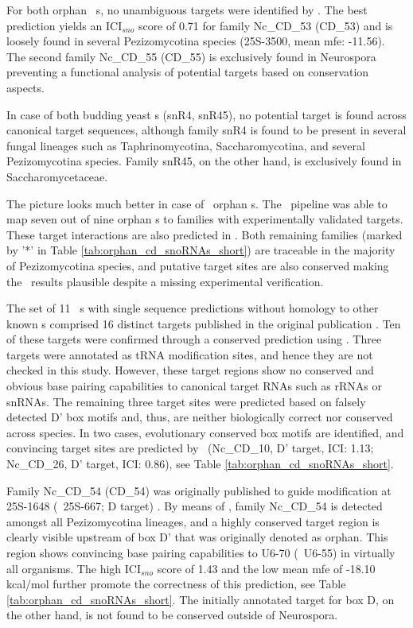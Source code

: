 For both orphan \ncr\ \sno s, no unambiguous targets were identified by
\snostrip. The best prediction yields an ICI$_{sno}$ score of 0.71 for
family Nc\_CD\_53 (CD\_53) and is loosely found in several
Pezizomycotina species (25S-3500, mean mfe: -11.56). The second family
Nc\_CD\_55 (CD\_55) is exclusively found in Neurospora preventing a
functional analysis of potential targets based on conservation
aspects.

In case of both budding yeast \sno s (snR4, snR45), no potential target is
found across canonical target sequences, although family snR4 is found to
be present in several fungal lineages such as Taphrinomycotina,
Saccharomycotina, and several Pezizomycotina species. Family snR45, on the
other hand, is exclusively found in Saccharomycetaceae.

The picture looks much better in case of \afu\ orphan \sno s. The
\snostrip\ pipeline was able to map seven out of nine orphan \cd s to
families with experimentally validated targets. These target interactions
are also predicted in \afu. Both remaining families (marked by '*' in
Table \ref{tab:orphan_cd_snoRNAs_short}) are traceable in the majority of
Pezizomycotina species, and putative target sites are also conserved making
the \snostrip\ results plausible despite a missing experimental
verification.

The set of 11 \ncr\ \sno s with single sequence predictions without
homology to other known \sno s comprised 16 distinct targets
published in the original publication \cite{Li:2005}.  Ten of these targets
were confirmed through a conserved prediction using \snostrip.  Three
targets were annotated as tRNA modification sites, and hence they are not
checked in this study. However, these target regions show no conserved and
obvious base pairing capabilities to canonical target RNAs such as rRNAs or
snRNAs. The remaining three target sites were predicted based on falsely
detected D' box motifs and, thus, are neither biologically correct nor
conserved across species. In two cases, evolutionary conserved box motifs
are identified, and convincing target sites are predicted by \snostrip\
(Nc\_CD\_10, D' target, ICI: 1.13; Nc\_CD\_26, D' target, ICI: 0.86), see
Table \ref{tab:orphan_cd_snoRNAs_short}.

Family Nc\_CD\_54 (CD\_54) was originally published to guide modification
at 25S-1648 (\ncr\ 25S-667; D target) \cite{Liu:2009}. By means of
\snostrip, family Nc\_CD\_54 is detected amongst all Pezizomycotina
lineages, and a highly conserved target region is clearly visible upstream
of box D' that was originally denoted as orphan. This region shows
convincing base pairing capabilities to U6-70 (\ncr\ U6-55) in virtually
all organisms. The high ICI$_{sno}$ score of 1.43 and
the low mean mfe of -18.10 kcal/mol further promote the correctness of this
prediction, see Table \ref{tab:orphan_cd_snoRNAs_short}. The initially
annotated target for box D, on the other hand, is not found to be
conserved outside of Neurospora.

